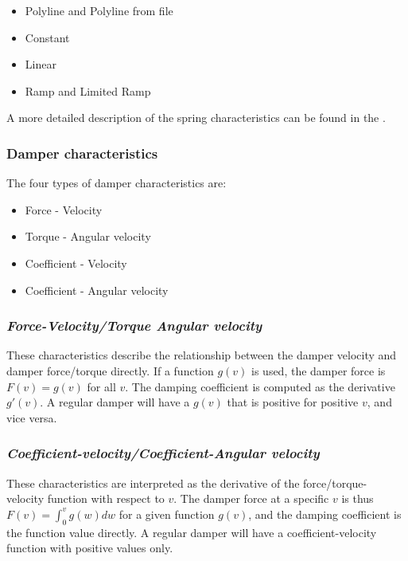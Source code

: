 \begin{itemize}
\item Polyline and Polyline from file
\item Constant
\item Linear
\item Ramp and Limited Ramp
\end{itemize}

A more detailed description of the spring characteristics can be found in the
.

\subsubsection{Damper characteristics}

The four types of damper characteristics are:

\begin{itemize}
\item Force - Velocity
\item Torque - Angular velocity
\item Coefficient - Velocity
\item Coefficient - Angular velocity
\end{itemize}

\subsubsection{\sl\textbf{Force-Velocity/Torque Angular velocity}}

These characteristics describe the relationship between the damper velocity
and damper force/torque directly.
If a function $g(v)$ is used, the damper force is $F(v)=g(v)$ for all $v$.
The damping coefficient is computed as the derivative $g'(v)$.
A regular damper will have a $g(v)$ that is positive for positive $v$,
and vice versa.

\subsubsection{\sl\textbf{Coefficient-velocity/Coefficient-Angular velocity}}

These characteristics are interpreted as the derivative of the force/torque-
velocity function with respect to $v$. The damper force at a specific $v$ is
thus $F(v)=\int_0^vg(w)dw$ for a given function $g(v)$,
and the damping coefficient is the function value directly. A regular damper
will have a coefficient-velocity function with positive values only.

